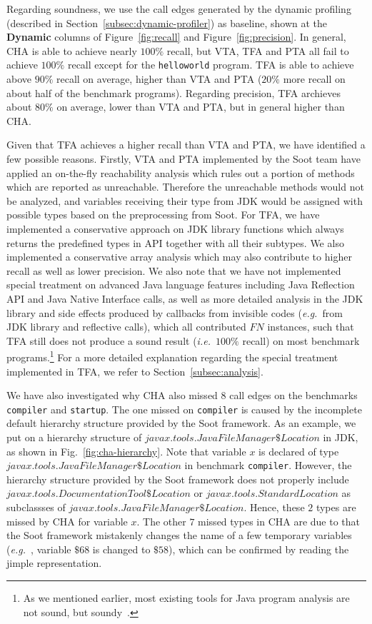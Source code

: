 \documentclass{fac}
\newcommand\eg{\textit{e.g.\ }}
\newcommand\ie{\textit{i.e.\ }}
\begin{document}

Regarding soundness, we use the call edges generated by the dynamic profiling (described in Section~\ref{subsec:dynamic-profiler}) as baseline, shown at the \textbf{Dynamic} columns of Figure~\ref{fig:recall} and Figure~\ref{fig:precision}. In general, CHA is able to achieve nearly $100\%$ recall, but VTA, TFA and PTA all fail to achieve $100\%$ recall except for the \texttt{helloworld} program. TFA is able to achieve above $90\%$ recall on average, higher than VTA and PTA ($20\%$ more recall on about half of the benchmark programs). Regarding precision, TFA archieves about $80\%$ on average, lower than VTA and PTA, but in general higher than CHA.

Given that TFA achieves a higher recall than VTA and PTA, we have identified a few possible reasons. Firstly, VTA and PTA implemented by the Soot team have applied an on-the-fly reachability analysis which rules out a portion of methods which are reported as unreachable. Therefore the unreachable methods would not be analyzed, and variables receiving their type from JDK would be assigned with possible types based on the preprocessing from Soot. For TFA, we have implemented a conservative approach on JDK library functions which always returns the predefined types in API together with all their subtypes. We also implemented a conservative array analysis which may also contribute to higher recall as well as lower precision. We also note that we have not implemented special treatment on advanced Java language features including Java Reflection API and Java Native Interface calls, as well as more detailed analysis in the JDK library and side effects produced by callbacks from invisible codes (\eg from JDK library and reflective calls), which all contributed $FN$ instances, such that TFA still does not produce a sound result (\ie $100\%$ recall) on most benchmark programs.\footnote{As we mentioned earlier, most existing tools for Java program analysis are not sound, but soundy~\cite{LivshitsSSLACGKMV15}.}
For a more detailed explanation regarding the special treatment implemented in TFA, we refer to Section~\ref{subsec:analysis}.

We have also investigated why CHA also missed $8$ call edges on the benchmarks \texttt{compiler} and \texttt{startup}. The one missed on \texttt{compiler} is caused by the incomplete default hierarchy structure provided by the Soot framework. As an example, we put on a hierarchy structure of $javax.tools.JavaFileManager\$Location$ in JDK, as shown in Fig.~\ref{fig:cha-hierarchy}. Note that variable $x$ is declared of type $javax.tools.JavaFileManager\$Location$ in benchmark \texttt{compiler}. However, the hierarchy structure provided by the Soot framework does not properly include $javax.tools.DocumentationTool\$Location$ or $javax.tools.StandardLocation$ as subclassses of $javax.tools.JavaFileManager\$Location$. Hence, these $2$ types are missed by CHA for variable $x$. The other $7$ missed types in CHA are due to that the Soot framework mistakenly changes the name of a few temporary variables (\eg, variable $\$68$ is changed to $\$58$), which can be confirmed by reading the jimple representation. %
\end{document}
